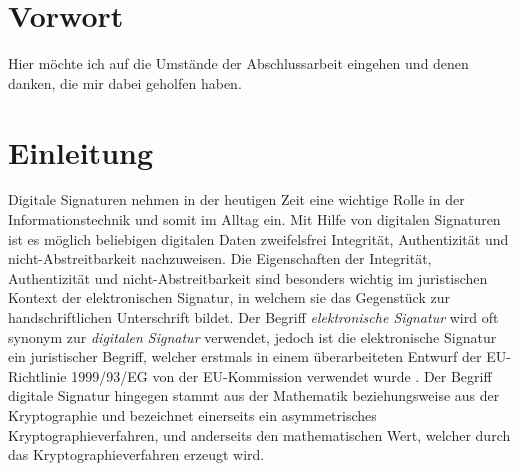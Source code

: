 \documentclass[11pt,a4paper,ngerman]{scrreprt}
\begin{document}
\maketitle



\chapter*{Vorwort}
Hier möchte ich auf die Umstände der Abschlussarbeit eingehen und denen danken, die mir dabei geholfen haben.
\clearpage

\tableofcontents
\clearpage


\chapter{Einleitung}
Digitale Signaturen nehmen in der heutigen Zeit eine wichtige Rolle in der Informationstechnik und somit im Alltag ein. Mit Hilfe von digitalen Signaturen ist es möglich beliebigen digitalen Daten zweifelsfrei Integrität, Authentizität und nicht-Abstreitbarkeit nachzuweisen. Die Eigenschaften der Integrität, Authentizität und nicht-Abstreitbarkeit sind besonders wichtig im juristischen Kontext der elektronischen Signatur, in welchem sie das Gegenstück zur handschriftlichen Unterschrift bildet. Der Begriff \emph{elektronische Signatur} wird oft synonym zur \emph{digitalen Signatur} verwendet, jedoch ist die elektronische Signatur ein juristischer Begriff, welcher erstmals in einem überarbeiteten Entwurf der EU-Richtlinie 1999/93/EG von der EU-Kommission verwendet wurde \cite{eSigEU99}. Der Begriff digitale Signatur hingegen stammt aus der Mathematik beziehungsweise aus der Kryptographie und bezeichnet einerseits ein asymmetrisches Kryptographieverfahren, und anderseits den mathematischen Wert, welcher durch das Kryptographieverfahren erzeugt wird.
\end{document}
